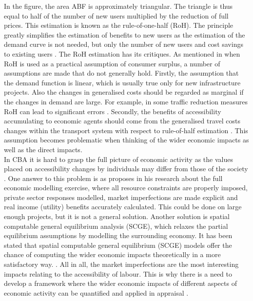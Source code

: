 In the figure, the area ABF is approximately triangular. The triangle is thus equal to half of the number of new users multiplied by the reduction of full prices. This estimation is known as the rule-of-one-half (RoH). The principle greatly simplifies the estimation of benefits to new users as the estimation of the demand curve is not needed, but only the number of new users and cost savings to existing users \citep{small}. The RoH estimation has its critiques. As mentioned in \cite{geurs} when RoH is used as a practical assumption of consumer surplus, a number of assumptions are made that do not generally hold. Firstly, the assumption that the demand function is linear, which is usually true only for new infrastructure projects. Also the changes in generalised costs should be regarded as marginal if the changes in demand are large. For example, in some traffic reduction measures RoH can lead to significant errors \citep{geurs}. Secondly, the benefits of accessibility accumulating to economic agents should come from the generalised travel costs changes within the transport system with respect to rule-of-half estimation \citep{geurs}. This assumption becomes problematic when thinking of the wider economic impacts as well as the direct impacts. \\

In CBA it is hard to grasp the full picture of economic activity as the values placed on accessibility changes by individuals may differ from those of the society \citep{andersson}. One answer to this problem is as \cite{venables2017} proposes in his research about the full economic modelling exercise, where all resource constraints are properly imposed, private sector responses modelled, market imperfections are made explicit and real income (utility) benefits accurately calculated. This could be done on large enough projects, but it is not a general solution. Another solution is spatial computable general equilibrium analysis (SCGE), which relaxes the partial equilibrium assumptions by modelling the surrounding economy. It has been stated that spatial computable general equilibrium (SCGE) models offer the chance of computing the wider economic impacts theoretically in a more satisfactory way. \citep{andersson}. All in all, the market imperfections are the most interesting impacts relating to the accessibility of labour. This is why there is a need to develop a framework where the wider economic impacts of different aspects of economic activity can be quantified and applied in appraisal \citep{venables2017}. \\

